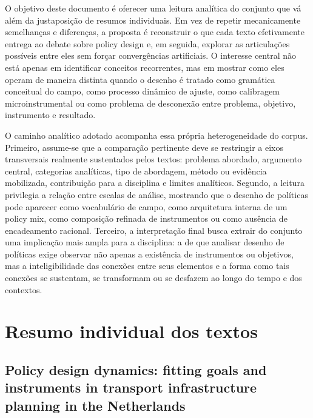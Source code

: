 \documentclass[12pt,a4paper]{article}
\begin{document}
O objetivo deste documento é oferecer uma leitura analítica do conjunto que vá além da justaposição de resumos individuais. Em vez de repetir mecanicamente semelhanças e diferenças, a proposta é reconstruir o que cada texto efetivamente entrega ao debate sobre policy design e, em seguida, explorar as articulações possíveis entre eles sem forçar convergências artificiais. O interesse central não está apenas em identificar conceitos recorrentes, mas em mostrar como eles operam de maneira distinta quando o desenho é tratado como gramática conceitual do campo, como processo dinâmico de ajuste, como calibragem microinstrumental ou como problema de desconexão entre problema, objetivo, instrumento e resultado.

O caminho analítico adotado acompanha essa própria heterogeneidade do corpus. Primeiro, assume-se que a comparação pertinente deve se restringir a eixos transversais realmente sustentados pelos textos: problema abordado, argumento central, categorias analíticas, tipo de abordagem, método ou evidência mobilizada, contribuição para a disciplina e limites analíticos. Segundo, a leitura privilegia a relação entre escalas de análise, mostrando que o desenho de políticas pode aparecer como vocabulário de campo, como arquitetura interna de um policy mix, como composição refinada de instrumentos ou como ausência de encadeamento racional. Terceiro, a interpretação final busca extrair do conjunto uma implicação mais ampla para a disciplina: a de que analisar desenho de políticas exige observar não apenas a existência de instrumentos ou objetivos, mas a inteligibilidade das conexões entre seus elementos e a forma como tais conexões se sustentam, se transformam ou se desfazem ao longo do tempo e dos contextos.



\section{Resumo individual dos textos}
\label{sec:orgea2db5e}



\subsection{Policy design dynamics: fitting goals and instruments in transport infrastructure planning in the Netherlands}
\label{sec:orgfd25f3e}
\end{document}
